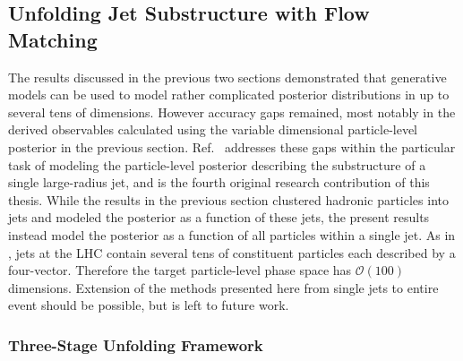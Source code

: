 \FloatBarrier

\subsection{Unfolding Jet Substructure with Flow Matching}
\label{sec:cfm-jets}

The results discussed in the previous two sections demonstrated that generative models can be used to model rather complicated posterior distributions in up to several tens of dimensions.
However accuracy gaps remained, most notably in the derived observables calculated using the variable dimensional particle-level posterior in the previous section.
Ref.~\cite{Petitjean:2025tgk} addresses these gaps within the particular task of modeling the particle-level posterior describing the substructure of a single large-radius jet, and is the fourth original research contribution of this thesis.
While the results in the previous section clustered hadronic particles into jets and modeled the posterior as a function of these jets, the present results instead model the posterior as a function of all particles within a single jet.
As in , jets at the LHC contain several tens of constituent particles each described by a four-vector.
Therefore the target particle-level phase space has $\mathcal{O}(100)$ dimensions.
Extension of the methods presented here from single jets to entire event should be possible, but is left to future work.

\subsubsection{Three-Stage Unfolding Framework}


